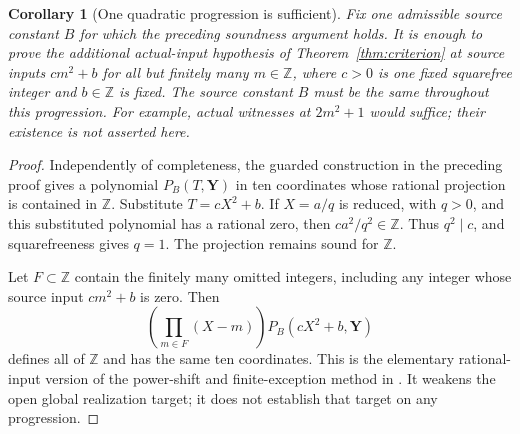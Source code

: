 \documentclass[11pt]{article}
\newcommand{\Z}{\mathbb Z}
\newtheorem{corollary}[theorem]{Corollary}
\theoremstyle{remark}\newtheorem{remark}[theorem]{Remark}
\begin{document}
\begin{corollary}[One quadratic progression is sufficient]\label{cor:progression}
Fix one admissible source constant \(B\) for which the preceding
soundness argument holds. It is enough to prove the additional
actual-input hypothesis of Theorem~\ref{thm:criterion} at source inputs
\(cm^2+b\) for all but finitely many \(m\in\Z\), where
\(c>0\) is one fixed squarefree integer and \(b\in\Z\) is fixed.
The source constant \(B\) must be the same throughout this progression.
For example, actual witnesses at \(2m^2+1\) would suffice; their
existence is not asserted here.
\end{corollary}
\begin{proof}
Independently of completeness, the guarded construction in the preceding
proof gives a polynomial \(P_B(T,\mathbf Y)\) in ten coordinates whose
rational projection is contained in \(\Z\). Substitute
\(T=cX^2+b\). If \(X=a/q\) is reduced, with \(q>0\), and this
substituted polynomial has a rational zero, then \(ca^2/q^2\in\Z\).
Thus \(q^2\mid c\), and squarefreeness gives \(q=1\).
The projection remains sound for \(\Z\).

Let \(F\subset\Z\) contain the finitely many omitted integers, including
any integer whose source input \(cm^2+b\) is zero. Then
\[
 \left(\prod_{m\in F}(X-m)\right)P_B(cX^2+b,\mathbf Y)
\]
defines all of \(\Z\) and has the same ten coordinates. This is the
elementary rational-input version of the power-shift and finite-exception
method in \cite{powers}. It weakens the open global realization target;
it does not establish that target on any progression.
\end{proof}
\end{document}
